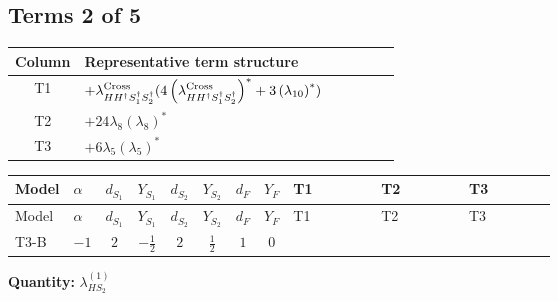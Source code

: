 \documentclass[8pt]{article}
\begin{document}
\begin{landscape}
\subsection*{Terms 2 of 5}
\begin{center}
\begin{tabular}{@{}c >{\raggedright\arraybackslash}p{0.82\linewidth}@{}}
\toprule
Column & Representative term structure \\
\midrule
T1 & \(\displaystyle +{\lambda_{H H^\dagger S_1^\dagger S_2^\dagger}^{\rm Cross}} (4 \left({\lambda_{H H^\dagger S_1^\dagger S_2^\dagger}^{\rm Cross}}\right)^{*}+3 \left({\lambda_{10}}\right)^{*})\) \\
\midrule
T2 & \(\displaystyle +24 {\lambda_{8}} \left({\lambda_{8}}\right)^{*}\) \\
\midrule
T3 & \(\displaystyle +6 {\lambda_5} \left({\lambda_5}\right)^{*}\) \\
\midrule
\bottomrule
\end{tabular}
\end{center}
\smallskip
\tiny
\begin{longtable}{@{}llcccccc >{\raggedright\arraybackslash}p{0.21\linewidth} >{\raggedright\arraybackslash}p{0.21\linewidth} >{\raggedright\arraybackslash}p{0.21\linewidth}@{}}
\toprule
Model & $\alpha$ & $d_{S_1}$ & $Y_{S_1}$ & $d_{S_2}$ & $Y_{S_2}$ & $d_F$ & $Y_F$ & T1 & T2 & T3 \\
\midrule
\endfirsthead
\toprule
Model & $\alpha$ & $d_{S_1}$ & $Y_{S_1}$ & $d_{S_2}$ & $Y_{S_2}$ & $d_F$ & $Y_F$ & T1 & T2 & T3 \\
\midrule
\endhead
T3-B & $-1$ & $2$ & $-\frac{1}{2}$ & $2$ & $\frac{1}{2}$ & $1$ & $0$ & \scriptsize\adjustbox{max width=\linewidth}{$\begin{gathered} +{\lambda_{H H^\dagger S_1^\dagger S_2^\dagger}^{\rm Cross}} (4 \left({\lambda_{H H^\dagger S_1^\dagger S_2^\dagger}^{\rm Cross}}\right)^{*}+3 \left({\lambda_{10}}\right)^{*})\end{gathered}$} & \scriptsize\adjustbox{max width=\linewidth}{$\begin{gathered} +24 {\lambda_{8}} \left({\lambda_{8}}\right)^{*}\end{gathered}$} & \scriptsize\adjustbox{max width=\linewidth}{$\begin{gathered} +6 {\lambda_5} \left({\lambda_5}\right)^{*}\end{gathered}$} \\
\midrule
\bottomrule
\end{longtable}
\clearpage
\noindent\textbf{Quantity: }$\lambda_{HS_2}^{(1)}$\par\smallskip

\end{landscape}
\end{document}
